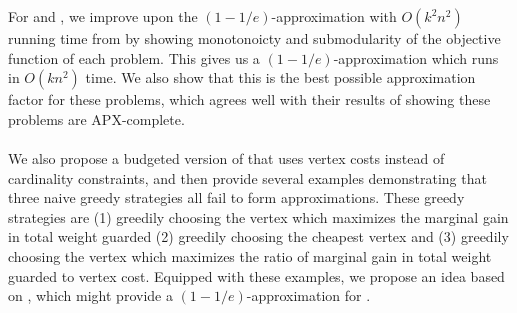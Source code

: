 For \MLVG{} and \MVVG{}, we improve upon the $(1-1/e)$-approximation with $O(k^2n^2)$ running time from \cite{fragoudakis-interior,fragoudakis-boundary,fragoudakis-paintings} by showing monotonoicty and submodularity of the objective function of each problem. This gives us a $(1-1/e)$-approximation which runs in $O(kn^2)$ time. We also show that this is the best possible approximation factor for these problems, which agrees well with their results of showing these problems are APX-complete.\\\\
We also propose a budgeted version of \MVVG{} that uses vertex costs instead of cardinality constraints, and then provide several examples demonstrating that three naive greedy strategies all fail to form approximations. These greedy strategies are (1) greedily choosing the vertex which maximizes the marginal gain in total weight guarded (2) greedily choosing the cheapest vertex and (3) greedily choosing the vertex which maximizes the ratio of marginal gain in total weight guarded to vertex cost. Equipped with these examples, we propose an idea based on \cite{khuller}, which might provide a $(1-1/e)$-approximation for \BMVVG{}. 

